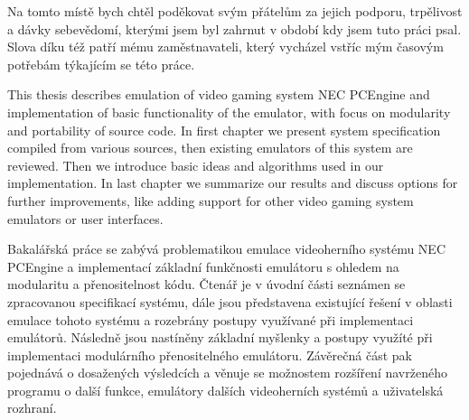 \documentclass[11pt,oneside,a4paper]{book}
\begin{document}


\coverpage

\acknowledgements
\noindent
Na tomto místě bych chtěl poděkovat svým přátelům za jejich podporu, trpělivost
a dávky sebevědomí, kterými jsem byl zahrnut v období kdy jsem tuto práci psal.
Slova díku též patří mému zaměstnavateli, který vycházel vstříc mým časovým
potřebám týkajícím se této práce. \\


\abstract
This thesis describes emulation of video gaming system NEC PCEngine and
implementation of basic functionality of the emulator, with focus on modularity
and portability of source code. In first chapter we present system
specification compiled from various sources, then existing emulators of this
system are reviewed. Then we introduce basic ideas and algorithms used in our
implementation. In last chapter we summarize our results and discuss options
for further improvements, like adding support for other video gaming system
emulators or user interfaces.

\vglue 60mm
\baselineskip
Bakalářská práce se zabývá problematikou emulace videoherního systému NEC
PCEngine a implementací základní funkčnosti emulátoru s ohledem na modularitu a
přenositelnost kódu. Čtenář je v úvodní části seznámen se zpracovanou
specifikací systému, dále jsou představena existující řešení v oblasti emulace
tohoto systému a rozebrány postupy využívané při implementaci emulátorů.
Následně jsou nastíněny základní myšlenky a postupy využíté při implementaci
modulárního přenositelného emulátoru. Závěrečná část pak pojednává o dosažených
výsledcích a věnuje se možnostem rozšíření navrženého programu o další funkce,
emulátory dalších videoherních systémů a uživatelská rozhraní.

\setcounter{tocdepth}{2}
\tableofcontents
\end{document}
